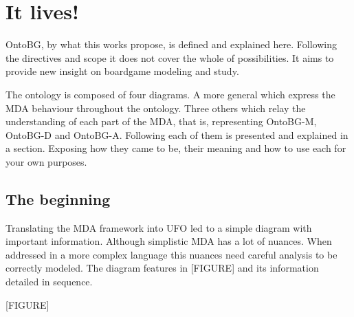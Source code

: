 \section{It lives!}

OntoBG, by what this works propose, is defined and explained here. Following the directives and scope it does not cover the whole of possibilities. It aims to provide new insight on boardgame modeling and study. 

The ontology is composed of four diagrams. A more general which express the MDA behaviour throughout the ontology. Three others which relay the understanding of each part of the MDA, that is, representing OntoBG-M, OntoBG-D and OntoBG-A. Following each of them is presented and explained in a section. Exposing how they came to be, their meaning and how to use each for your own purposes.  

\subsection{The beginning}

Translating the MDA framework into UFO led to a simple diagram with important information. Although simplistic MDA has a lot of nuances. When addressed in a more complex language this nuances need careful analysis to be correctly modeled. The diagram features in [FIGURE] and its information detailed in sequence.

[FIGURE]

